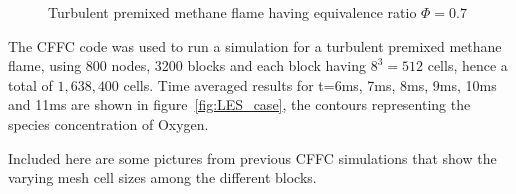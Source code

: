 \begin{figure}[t!]
  \centering
   \:

\caption{Turbulent premixed methane flame having equivalence ratio $\Phi = 0.7$}    
 \label{fig:LES_case2}        
\end{figure}  


The CFFC code was used to run a simulation for a turbulent premixed methane flame, using 800 nodes, 3200 blocks and each block having $8^3 = 512$ cells, hence a total of $1,638,400$ cells. Time averaged results for t=6ms, 7ms, 8ms, 9ms, 10ms and 11ms are shown in figure~\ref{fig:LES_case}, the contours representing the species concentration of Oxygen.\par


Included here are some pictures from previous CFFC simulations that show the varying mesh cell sizes among the different blocks.

